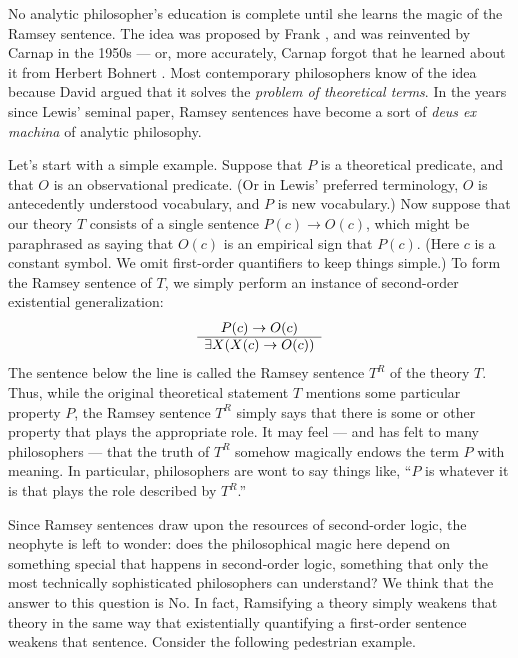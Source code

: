 

No analytic philosopher's education is complete until she learns the
magic of the Ramsey sentence.  The idea was proposed by Frank
\cite{ramsey}, and was reinvented by Carnap in the 1950s --- or, more
accurately, Carnap forgot that he learned about it from Herbert
Bohnert \cite[see][]{psillos2000}.  Most contemporary philosophers
know of the idea because David \cite{lewis-terms} argued that it
solves the \emph{problem of theoretical terms}.  In the years since
Lewis' seminal paper, Ramsey sentences have become a sort of {\it deus
  ex machina} of analytic philosophy.

Let's start with a simple example.  Suppose that $P$ is a theoretical
predicate, and that $O$ is an observational predicate.  (Or in Lewis'
preferred terminology, $O$ is antecedently understood vocabulary, and
$P$ is new vocabulary.)  Now suppose that our theory $T$ consists of a
single sentence $P(c)\to O(c)$, which might be paraphrased as saying
that $O(c)$ is an empirical sign that $P(c)$.  (Here $c$ is a constant
symbol.  We omit first-order quantifiers to keep things simple.)  To
form the Ramsey sentence of $T$, we simply perform an instance of
second-order existential generalization:
\[ \begin{array}{c c} P(c)\to O(c) \\ \hline \exists X(X(c)\to
    O(c)) \end{array} \] The sentence below the line is called the
Ramsey sentence $T^R$ of the theory $T$.  Thus, while the original
theoretical statement $T$ mentions some particular property $P$, the
Ramsey sentence $T^R$ simply says that there is some or other property
that plays the appropriate role.  It may feel --- and has felt to many
philosophers --- that the truth of $T^R$ somehow magically endows the
term $P$ with meaning.  In particular, philosophers are wont to say
things like, ``$P$ is whatever it is that plays the role described by
$T^R$.''

Since Ramsey sentences draw upon the resources of second-order logic,
the neophyte is left to wonder: does the philosophical magic here
depend on something special that happens in second-order logic,
something that only the most technically sophisticated philosophers
can understand?  We think that the answer to this question is No.  In
fact, Ramsifying a theory simply weakens that theory in the same way
that existentially quantifying a first-order sentence weakens that
sentence.  Consider the following pedestrian example.

